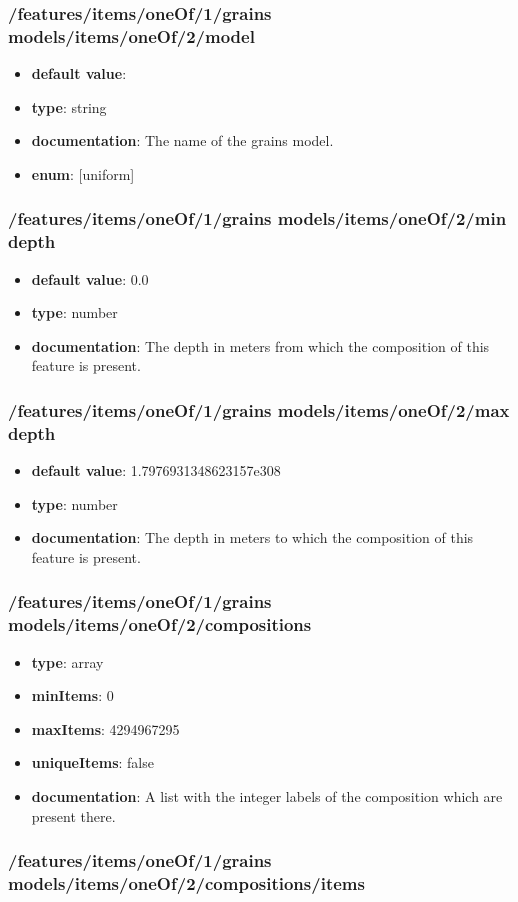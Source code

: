 \subsubsection{/features/items/oneOf/1/grains models/items/oneOf/2/model}
\begin{itemize}\item {\bf default value}: 
\item {\bf type}: string
\item {\bf documentation}: The name of the grains model.
\item {\bf enum}: [uniform]\end{itemize}\subsubsection{/features/items/oneOf/1/grains models/items/oneOf/2/min depth}
\begin{itemize}\item {\bf default value}: 0.0
\item {\bf type}: number
\item {\bf documentation}: The depth in meters from which the composition of this feature is present.
\end{itemize}\subsubsection{/features/items/oneOf/1/grains models/items/oneOf/2/max depth}
\begin{itemize}\item {\bf default value}: 1.7976931348623157e308
\item {\bf type}: number
\item {\bf documentation}: The depth in meters to which the composition of this feature is present.
\end{itemize}\subsubsection{/features/items/oneOf/1/grains models/items/oneOf/2/compositions}
\begin{itemize}\item {\bf type}: array
\item {\bf minItems}: 0
\item {\bf maxItems}: 4294967295
\item {\bf uniqueItems}: false
\item {\bf documentation}: A list with the integer labels of the composition which are present there.
\end{itemize}\subsubsection{/features/items/oneOf/1/grains models/items/oneOf/2/compositions/items}
